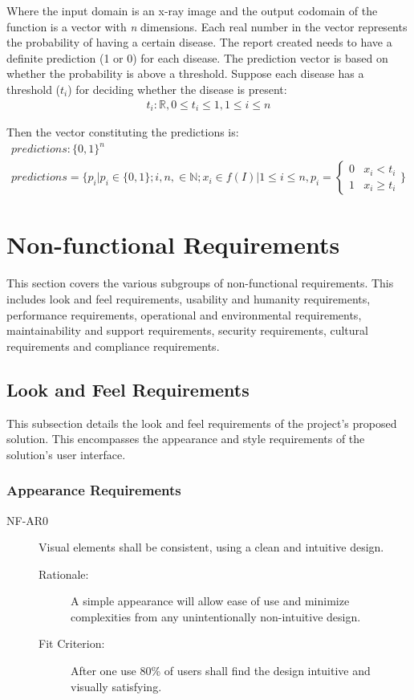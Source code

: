 \documentclass[12pt]{article}
\begin{document}
\noindent Where the input domain is an x-ray image and the output codomain of the function is a vector with \textit{n} dimensions.
Each real number in the vector represents the probability of having a certain disease. 
The report created needs to have a definite prediction (1 or 0) for each disease. The prediction vector is based on whether the probability is above a threshold.  
Suppose each disease has a threshold ($t_i$) for deciding whether the disease is present: 
\begin{align*}
    t_i: \mathbb{R}, 0 \le t_i \le 1, 1 \le i \le n
\end{align*}

\noindent Then the vector constituting the predictions is:
\begin{gather*}
    predictions: \{0,1\}^n \\
    predictions = \Biggl\{ p_i \big| p_i \in \{ 0, 1 \}; i, n, \in \mathbb{N}; x_i \in f(I) \big| 1 \le i \le n, p_i =
    \begin{cases}
        0 & x_i < t_i \\
        1 & x_i \ge t_i
    \end{cases}
    \Biggr\}
\end{gather*}

\section{Non-functional Requirements}
This section covers the various subgroups of non-functional requirements. This includes
look and feel requirements, usability and humanity requirements, performance requirements,
operational and environmental requirements, maintainability and support requirements,
security requirements, cultural requirements and compliance requirements.

\subsection{Look and Feel Requirements}
This subsection details the look and feel requirements of the project's proposed solution.
This encompasses the appearance and style requirements of the solution's user interface.

\subsubsection{Appearance Requirements}
\begin{description}
    \item[NF-AR0] Visual elements shall be consistent, using a clean and intuitive design.
    \begin{description}
        \item[Rationale:] A simple appearance will allow ease of use and minimize complexities from any unintentionally non-intuitive design.
        \item[Fit Criterion:] After one use 80\% of users shall find the design intuitive and visually satisfying.
    \end{description}
\end{description}
\end{document}
